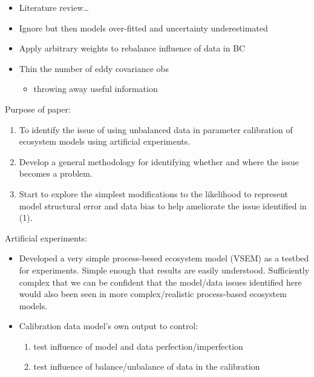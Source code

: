\documentclass[]{article}
\providecommand{\tightlist}{%
  \setlength{\itemsep}{0pt}\setlength{\parskip}{0pt}}
\begin{document}
\begin{itemize}
\tightlist
\item
  Literature review\ldots{}
\item
  Ignore but then models over-fitted and uncertainty underestimated
\item
  Apply arbitrary weights to rebalance influence of data in BC
\item
  Thin the number of eddy covariance obs

  \begin{itemize}
  \tightlist
  \item
    throwing away useful information
  \end{itemize}
\end{itemize}

Purpose of paper:

\begin{enumerate}
\def\labelenumi{\arabic{enumi}.}
\tightlist
\item
  To identify the issue of using unbalanced data in parameter
  calibration of ecosystem models using artificial experiments.
\item
  Develop a general methodology for identifying whether and where the
  issue becomes a problem.
\item
  Start to explore the simplest modifications to the likelihood to
  represent model structural error and data bias to help ameliorate the
  issue identified in (1).
\end{enumerate}

Artificial experiments:

\begin{itemize}
\tightlist
\item
  Developed a very simple process-besed ecosystem model (VSEM) as a
  testbed for experiments. Simple enough that results are easily
  understood. Sufficiently complex that we can be confident that the
  model/data issues identified here would also been seen in more
  complex/realistic process-based ecosystem models.
\item
  Calibration data model's own output to control:

  \begin{enumerate}
  \def\labelenumi{\arabic{enumi}.}
  \tightlist
  \item
    test influence of model and data perfection/imperfection
  \item
    test influence of balance/unbalance of data in the calibration
  \end{enumerate}
\end{itemize}
\end{document}
